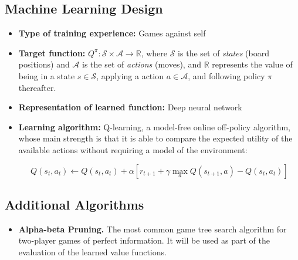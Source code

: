 \documentclass{article}
\begin{document}
\subsection{Machine Learning Design}

\begin{itemize}

    \item \textbf{Type of training experience:} Games against self

    \item \textbf{Target function:} $Q^\pi : \mathcal{S} \times \mathcal{A} \to \mathbb{R}$, where
        $\mathcal{S}$ is the set of \emph{states} (board positions) and $\mathcal{A}$ is the set of
        \emph{actions} (moves), and $\mathbb{R}$ represents the value of being in a state $s \in
        \mathcal{S}$, applying a action $a \in \mathcal{A}$, and following policy $\pi$ thereafter.

    \item \textbf{Representation of learned function:} Deep neural network

    \item \textbf{Learning algorithm:} Q-learning, a model-free online off-policy algorithm, whose
        main strength is that it is able to compare the expected utility of the available actions
        without requiring a model of the environment:

        \begin{equation}
        Q(s_t, a_t) \gets Q(s_t, a_t) + \alpha [r_{t+1} + \gamma \max_a Q(s_{t+1}, a) - Q(s_t, a_t)]
        \end{equation}


\end{itemize}

\subsection{Additional Algorithms}

\begin{itemize}

    \item \textbf{Alpha-beta Pruning.} The most common game tree search algorithm for two-player
        games of perfect information. It will be used as part of the evaluation of the learned value
        functions.

\end{itemize}




\end{document}
